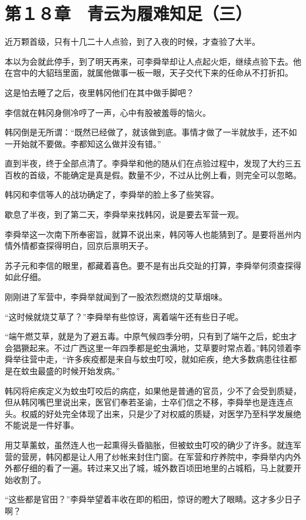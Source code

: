\section{第１８章　青云为履难知足（三）}

近万颗首级，只有十几二十人点验，到了入夜的时候，才查验了大半。

本以为会就此停手，到了明天再来，可李舜举却让人点起火炬，继续点验下去。他在宫中的大貂珰里面，就属他做事一板一眼，天子交代下来的任命从不打折扣。

这是怕去睡了之后，夜里韩冈他们在其中做手脚吧？

李信就在韩冈身侧冷哼了一声，心中有股被羞辱的恼火。

韩冈倒是无所谓：“既然已经做了，就该做到底。事情才做了一半就放手，还不如一开始就不要做。李都知这么做并没有错。”

直到半夜，终于全部点清了。李舜举和他的随从们在点验过程中，发现了大约三五百枚的首级，不能确定是真是假。数量不少，不过从比例上看，则完全可以忽略。

韩冈和李信等人的战功确定了，李舜举的脸上多了些笑容。

歇息了半夜，到了第二天，李舜举来找韩冈，说是要去军营一观。

李舜举这一次南下所奉密旨，就算不说出来，韩冈等人也能猜到了。是要将邕州内情外情都查探得明白，回京后禀明天子。

苏子元和李信的眼里，都藏着喜色。要不是有出兵交趾的打算，李舜举何须查探得如此仔细。

刚刚进了军营中，李舜举就闻到了一股浓烈燃烧的艾草烟味。

“这时候就烧艾草了？”李舜举有些惊讶，离着端午还有些日子呢。

“端午燃艾草，就是为了避五毒。中原气候四季分明，只有到了端午之后，蛇虫才会猖獗起来。不过广西这里一年四季都是蛇虫满地，艾草要时常点着。”韩冈领着李舜举往营中走，“许多疾疫都是来自与蚊虫叮咬，就如疟疾，绝大多数病患往往都是在蚊虫最盛的时候开始发病。”

韩冈将疟疾定义为蚊虫叮咬后的病症，如果他是普通的官员，少不了会受到质疑，但从韩冈嘴巴里说出来，医官们奉若圣谕，士卒们信之不移，李舜举也是连连点头。权威的好处完全体现了出来，只是少了对权威的质疑，对医学乃至科学发展绝不能说是一件好事。

用艾草薰蚊，虽然连人也一起熏得头昏脑胀，但被蚊虫叮咬的确少了许多。就连军营的营房，韩冈都是让人用了纱帐来封住门窗。在军营和疗养院中，李舜举内内外外都仔细的看了一遍。转过来又出了城，城外数百顷田地里的占城稻，马上就要开始收割了。

“这些都是官田？”李舜举望着丰收在即的稻田，惊讶的瞪大了眼睛。这才多少日子啊？

